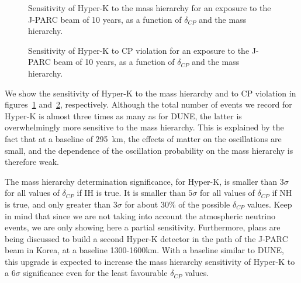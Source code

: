 \begin{figure}
	\centering
\caption{Sensitivity of Hyper-K to the mass hierarchy for an exposure to the J-PARC
	beam of 10 years, as a function of $\delta_{CP}$ and the mass hierarchy.}
\label{fig:hk_sens_mh}
\end{figure}

\begin{figure}
	\centering
\caption{Sensitivity of Hyper-K to CP violation for an exposure to the J-PARC
	beam of 10 years, as a function of $\delta_{CP}$ and the mass hierarchy.}
\label{fig:hk_sens_cp}
\end{figure}

We show the sensitivity of Hyper-K to the mass hierarchy and to CP violation in
figures~\ref{fig:hk_sens_mh} and~\ref{fig:hk_sens_cp}, respectively.
Although the total number of events we record for Hyper-K is almost three times
as many as for DUNE, the latter is overwhelmingly more sensitive to the mass
hierarchy. This is explained by the fact that at a baseline of \SI{295}{\km},
the effects of matter on the oscillations are small, and the dependence of the
oscillation probability on the mass hierarchy is therefore weak. 

The mass hierarchy determination significance, for Hyper-K, is smaller than
$3\sigma$ for all values of $\delta_{CP}$ if IH is true. It is smaller than
$5\sigma$ for all values of $\delta_{CP}$ if NH is true, and only greater than
$3\sigma$ for about 30\% of the possible $\delta_{CP}$ values.
Keep in mind that since we are not taking into account the atmospheric
neutrino events, we are only showing here a partial sensitivity. 
Furthermore, plans are being discussed\cite{t2hkk} to build a second Hyper-K detector in
the path of the J-PARC beam in Korea, at a baseline 1300-1600\si{\km}.
With a baseline similar to DUNE, this upgrade is expected to increase the mass
hierarchy sensitivity of Hyper-K to a $6\sigma$ significance even for the least
favourable $\delta_{CP}$ values.

